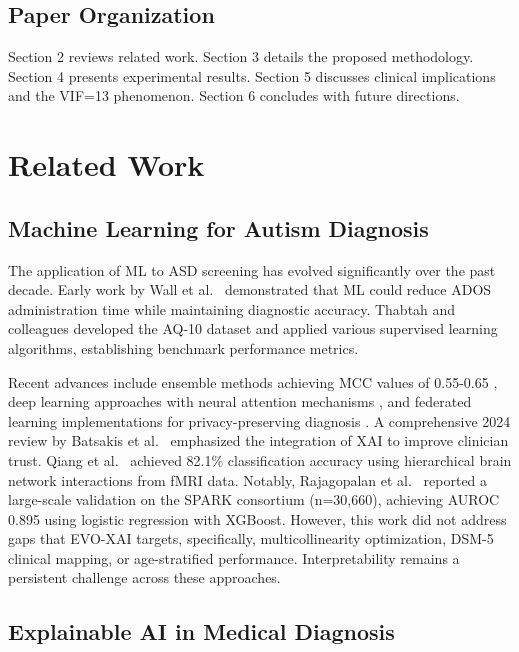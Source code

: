\subsection{Paper Organization}\label{paper-organization}

Section 2 reviews related work. Section 3 details the proposed methodology. Section 4 presents experimental results. Section 5 discusses clinical implications and the VIF=13 phenomenon. Section 6 concludes with future directions.

\section{Related Work}\label{related-work}

\subsection{Machine Learning for Autism Diagnosis}\label{machine-learning-for-autism-diagnosis}

The application of ML to ASD screening has evolved significantly over the past decade. Early work by Wall et al.~\cite{ref24} demonstrated that ML could reduce ADOS administration time while maintaining diagnostic accuracy. Thabtah and colleagues \cite{ref5,ref25} developed the AQ-10 dataset and applied various supervised learning algorithms, establishing benchmark performance metrics.

Recent advances include ensemble methods achieving MCC values of 0.55-0.65 \cite{ref10,ref26}, deep learning approaches with neural attention mechanisms \cite{ref11,ref27}, and federated learning implementations for privacy-preserving diagnosis \cite{ref28}. A comprehensive 2024 review by Batsakis et al.~\cite{ref29} emphasized the integration of XAI to improve clinician trust. Qiang et al.~\cite{ref30} achieved 82.1\% classification accuracy using hierarchical brain network interactions from fMRI data. Notably, Rajagopalan et al.~\cite{ref31} reported a large-scale validation on the SPARK consortium (n=30,660), achieving AUROC 0.895 using logistic regression with XGBoost. However, this work did not address gaps that EVO-XAI targets, specifically, multicollinearity optimization, DSM-5 clinical mapping, or age-stratified performance. Interpretability remains a persistent challenge across these approaches.

\subsection{Explainable AI in Medical Diagnosis}\label{explainable-ai-in-medical-diagnosis}

